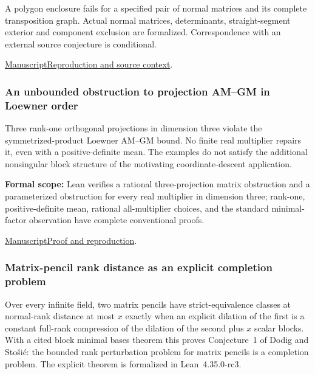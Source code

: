 \documentclass[11pt,a4paper]{article}
\begin{document}
A polygon enclosure fails for a specified pair of normal matrices and its complete transposition graph. Actual normal matrices, determinants, straight-segment exterior and component exclusion are formalized. Correspondence with an external source conjecture is conditional.

\href{https://github.com/dvgyl/math-and-theory/blob/main/papers/mathematics/kovacec/manuscript/manuscript.pdf}{Manuscript}\quad\href{https://github.com/dvgyl/math-and-theory/blob/main/papers/mathematics/kovacec/README.md}{Reproduction and source context}.

\subsubsection{An unbounded obstruction to projection AM--GM in Loewner order}

Three rank-one orthogonal projections in dimension three violate the symmetrized-product Loewner AM--GM bound. No finite real multiplier repairs it, even with a positive-definite mean. The examples do not satisfy the additional nonsingular block structure of the motivating coordinate-descent application.

\noindent\textbf{Formal scope:} Lean verifies a rational three-projection matrix obstruction and a parameterized obstruction for every real multiplier in dimension three; rank-one, positive-definite mean, rational all-multiplier choices, and the standard minimal-factor observation have complete conventional proofs.

\href{https://github.com/dvgyl/math-and-theory/blob/main/papers/mathematics/projection-amgm/paper.pdf}{Manuscript}\quad\href{https://github.com/dvgyl/math-and-theory/blob/main/papers/mathematics/projection-amgm/README.md}{Proof and reproduction}.

\subsubsection{Matrix-pencil rank distance as an explicit completion problem}

Over every infinite field, two matrix pencils have strict-equivalence classes at normal-rank distance at most $x$ exactly when an explicit dilation of the first is a constant full-rank compression of the dilation of the second plus $x$ scalar blocks. With a cited block minimal bases theorem this proves Conjecture~1 of Dodig and Sto\v{s}i\'c: the bounded rank perturbation problem for matrix pencils is a completion problem. The explicit theorem is formalized in Lean~4.35.0-rc3.
\end{document}
